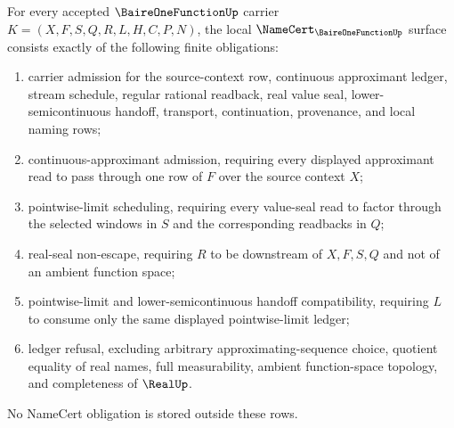 \begin{theorem}
\label{thm:baireonefunction-namecert-obligation-surface}
\label{thm:baire-one-function-namecert-obligations}
For every accepted $\BaireOneFunctionUp$ carrier $K=(X,F,S,Q,R,L,H,C,P,N)$, the local $\NameCert_{\BaireOneFunctionUp}$ surface consists exactly of the following finite obligations:
\begin{enumerate}
\item carrier admission for the source-context row, continuous approximant ledger, stream schedule, regular rational readback, real value seal, lower-semicontinuous handoff, transport, continuation, provenance, and local naming rows;
\item continuous-approximant admission, requiring every displayed approximant read to pass through one row of $F$ over the source context $X$;
\item pointwise-limit scheduling, requiring every value-seal read to factor through the selected windows in $S$ and the corresponding readbacks in $Q$;
\item real-seal non-escape, requiring $R$ to be downstream of $X,F,S,Q$ and not of an ambient function space;
\item pointwise-limit and lower-semicontinuous handoff compatibility, requiring $L$ to consume only the same displayed pointwise-limit ledger;
\item ledger refusal, excluding arbitrary approximating-sequence choice, quotient equality of real names, full measurability, ambient function-space topology, and completeness of $\RealUp$.
\end{enumerate}
No NameCert obligation is stored outside these rows.
\end{theorem}
